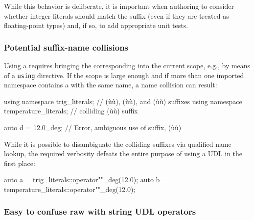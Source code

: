 \noindent While this behavior is deliberate, it is important when authoring
 to consider whether integer literals should match
the suffix (even if they are treated as floating-point types) and, if
so, to add appropriate unit tests.

\subsubsection[Potential suffix-name collisions]{Potential suffix-name collisions}\label{potential-suffix-name-collisions}

Using a  requires bringing the corresponding
 into the current scope, e.g., by means of a
\lstinline!using! directive. If the scope is large enough and if more than
one imported namespace contains a  with the same
name, a name collision can result:

\begin{emcppslisting}
using namespace trig_literals;        // (ù{}ù), (ù{}ù), and (ù{}ù) suffixes
using namespace temperature_literals; // colliding (ù{}ù) suffix

auto d = 12.0_deg;  // Error, ambiguous use of suffix, (ù{}ù)
\end{emcppslisting}
    

\noindent While it is possible to disambiguate the colliding suffixes via qualified name lookup, the required verbosity defeats the entire purpose of using a UDL in the first place:

\begin{emcppslisting}
auto a = trig_literals::operator""_deg(12.0);
auto b = temperature_literals::operator""_deg(12.0);
\end{emcppslisting}
   

\subsubsection[Easy to confuse raw with string UDL operators]{Easy to confuse raw with string UDL operators}\label{easy-to-confuse-raw-with-string-udl-operators}

